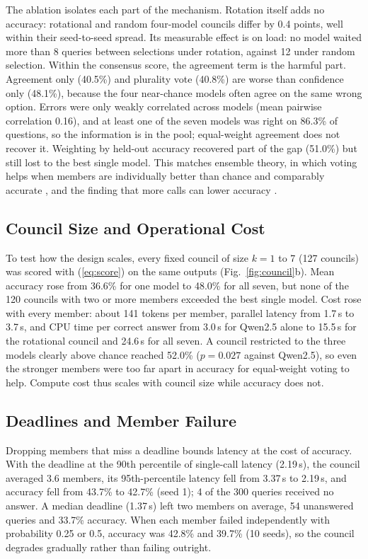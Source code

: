 The ablation isolates each part of the mechanism. Rotation itself adds no accuracy: rotational and random four-model councils differ by 0.4 points, well within their seed-to-seed spread. Its measurable effect is on load: no model waited more than 8 queries between selections under rotation, against 12 under random selection. Within the consensus score, the agreement term is the harmful part. Agreement only (40.5\%) and plurality vote (40.8\%) are worse than confidence only (48.1\%), because the four near-chance models often agree on the same wrong option. Errors were only weakly correlated across models (mean pairwise correlation 0.16), and at least one of the seven models was right on 86.3\% of questions, so the information is in the pool; equal-weight agreement does not recover it. Weighting by held-out accuracy recovered part of the gap (51.0\%) but still lost to the best single model. This matches ensemble theory, in which voting helps when members are individually better than chance and comparably accurate \cite{dietterich2000ensemble}, and the finding that more calls can lower accuracy \cite{chen2024calls}.

\subsection{Council Size and Operational Cost}
To test how the design scales, every fixed council of size $k=1$ to 7 (127 councils) was scored with (\ref{eq:score}) on the same outputs (Fig.~\ref{fig:council}b). Mean accuracy rose from 36.6\% for one model to 48.0\% for all seven, but none of the 120 councils with two or more members exceeded the best single model. Cost rose with every member: about 141 tokens per member, parallel latency from 1.7\,s to 3.7\,s, and CPU time per correct answer from 3.0\,s for Qwen2.5 alone to 15.5\,s for the rotational council and 24.6\,s for all seven. A council restricted to the three models clearly above chance reached 52.0\% ($p=0.027$ against Qwen2.5), so even the stronger members were too far apart in accuracy for equal-weight voting to help. Compute cost thus scales with council size while accuracy does not.

\subsection{Deadlines and Member Failure}
Dropping members that miss a deadline bounds latency at the cost of accuracy. With the deadline at the 90th percentile of single-call latency (2.19\,s), the council averaged 3.6 members, its 95th-percentile latency fell from 3.37\,s to 2.19\,s, and accuracy fell from 43.7\% to 42.7\% (seed 1); 4 of the 300 queries received no answer. A median deadline (1.37\,s) left two members on average, 54 unanswered queries and 33.7\% accuracy. When each member failed independently with probability 0.25 or 0.5, accuracy was 42.8\% and 39.7\% (10 seeds), so the council degrades gradually rather than failing outright.
